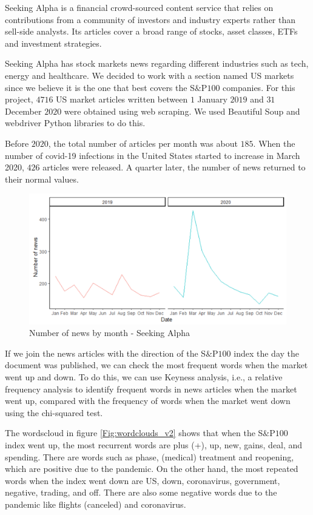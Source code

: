\documentclass[a4paper, 12pt]{report}
\begin{document}
    Seeking Alpha is a financial crowd-sourced content service that relies on contributions from a community of investors and industry experts rather than sell-side analysts. Its articles cover a broad range of stocks, asset classes, ETFs and investment strategies. 
    
    Seeking Alpha has stock markets news regarding different industries such as tech, energy and healthcare. We decided to work with a section named US markets since we believe it is the one that best covers the S$\&$P$100$ companies. For this project, $4716$ US market articles written between $1$ January $2019$ and $31$ December $2020$ were obtained using web scraping. We used Beautiful Soup and webdriver Python libraries to do this.  
    
    Before $2020$, the total number of articles per month was about $185$. When the number of covid-19 infections in the United States started to increase in March 2020, $426$ articles were released. A quarter later, the number of news returned to their normal values.
    
    \begin{figure}[H]
    \centering   \includegraphics[width=14cm]{graphs/Seeking_Alpha/No_news_year.png}
    \caption{Number of news by month - Seeking Alpha}
    \label{Fig:No of news}
    \end{figure}
    
    If we join the news articles with the direction of the S$\&$P$100$ index the day the document was published, we can check the most frequent words when the market went up and down. To do this, we can use Keyness analysis, i.e., a relative frequency analysis to identify frequent words in news articles when the market went up, compared with the frequency of words when the market went down using the chi-squared test.
    
    
    The wordscloud in figure \ref{Fig:wordclouds_v2} shows that when the S$\&$P$100$ index went up, the most recurrent words are plus (+), up, new, gains, deal, and spending. There are words such as phase, (medical) treatment and reopening, which are positive due to the pandemic. On the other hand, the most repeated words when the index went down are US, down, coronavirus, government, negative, trading, and off. There are also some negative words due to the pandemic like flights (canceled) and coronavirus.
    
\end{document}
